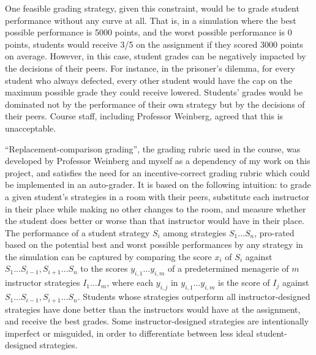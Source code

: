 \documentclass[pageno]{jpaper}
\begin{document}
One feasible grading strategy, given this constraint, would be to grade student performance without any curve at all.
That is, in a simulation where the best possible performance is 5000 points, and the worst possible performance is 0 points, students would receive 3/5 on the assignment if they scored 3000 points on average.
However, in this case, student grades can be negatively impacted by the decisions of their peers.
For instance, in the prisoner's dilemma, for every student who always defected, every other student would have the cap on the maximum possible grade they could receive lowered.
Students' grades would be dominated not by the performance of their own strategy but by the decisions of their peers.
Course staff, including Professor Weinberg, agreed that this is unacceptable.

``Replacement-comparison grading'', the grading rubric used in the course, was developed by Professor Weinberg and myself as a dependency of my work on this project, and satisfies the need for an incentive-correct grading rubric which could be implemented in an auto-grader.
It is based on the following intuition: to grade a given student's strategies in a room with their peers, substitute each instructor in their place while making no other changes to the room, and measure whether the student does better or worse than that instructor would have in their place.
The performance of a student strategy $S_i$ among strategies $S_1 \ldots S_n$, pro-rated based on the potential best and worst possible performances by any strategy in the simulation can be captured by comparing the score $x_i$ of $S_i$ against $S_1 \ldots S_{i-1}, S_{i+1} \ldots S_n$ to the scores $y_{i,1} \ldots y_{i,m}$ of a predetermined menagerie of $m$ instructor strategies $I_1 \ldots I_m$, where each $y_{i,j}$ in $y_{i,1} \ldots y_{i,m}$ is the score of $I_j$ against $S_1 \ldots S_{i-1}, S_{i+1} \ldots S_n$.
Students whose strategies outperform all instructor-designed strategies have done better than the instructors would have at the assignment, and receive the best grades.
Some instructor-designed strategies are intentionally imperfect or misguided, in order to differentiate between less ideal student-designed strategies.
\end{document}
